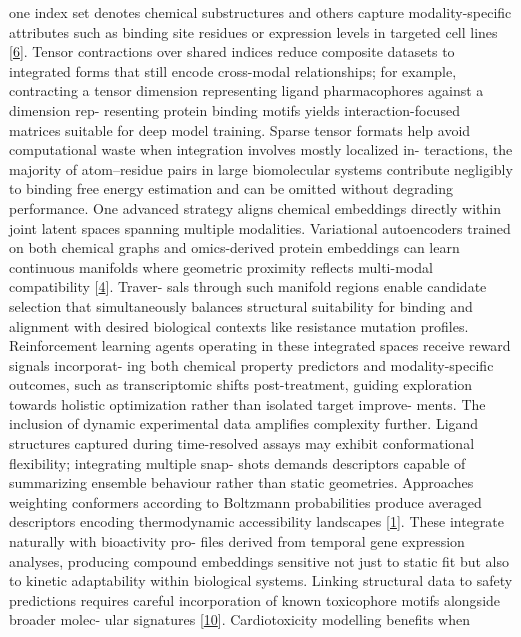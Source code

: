 \documentclass[
]{article}
\begin{document}
one index set denotes chemical substructures and others capture
modality-specific attributes such as binding site residues or expression
levels in targeted cell lines {[}\hyperref[_bookmark46]{6}{]}. Tensor
contractions over shared indices reduce composite datasets to integrated
forms that still encode cross-modal relationships; for example,
contracting a tensor dimension representing ligand pharmacophores
against a dimension rep- resenting protein binding motifs yields
interaction-focused matrices suitable for deep model training. Sparse
tensor formats help avoid computational waste when integration involves
mostly localized in- teractions, the majority of atom--residue pairs in
large biomolecular systems contribute negligibly to binding free energy
estimation and can be omitted without degrading performance. One
advanced strategy aligns chemical embeddings directly within joint
latent spaces spanning multiple modalities. Variational autoencoders
trained on both chemical graphs and omics-derived protein embeddings can
learn continuous manifolds where geometric proximity reflects
multi-modal compatibility {[}\hyperref[_bookmark44]{4}{]}. Traver- sals
through such manifold regions enable candidate selection that
simultaneously balances structural suitability for binding and alignment
with desired biological contexts like resistance mutation profiles.
Reinforcement learning agents operating in these integrated spaces
receive reward signals incorporat- ing both chemical property predictors
and modality-specific outcomes, such as transcriptomic shifts
post-treatment, guiding exploration towards holistic optimization rather
than isolated target improve- ments. The inclusion of dynamic
experimental data amplifies complexity further. Ligand structures
captured during time-resolved assays may exhibit conformational
flexibility; integrating multiple snap- shots demands descriptors
capable of summarizing ensemble behaviour rather than static geometries.
Approaches weighting conformers according to Boltzmann probabilities
produce averaged descriptors encoding thermodynamic accessibility
landscapes {[}\hyperref[_bookmark41]{1}{]}. These integrate naturally
with bioactivity pro- files derived from temporal gene expression
analyses, producing compound embeddings sensitive not just to static fit
but also to kinetic adaptability within biological systems. Linking
structural data to safety predictions requires careful incorporation of
known toxicophore motifs alongside broader molec- ular signatures
{[}\hyperref[_bookmark50]{10}{]}. Cardiotoxicity modelling benefits when
\end{document}
